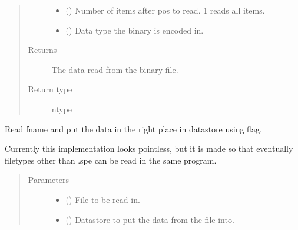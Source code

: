 \documentclass[a4paper,10pt,english]{sphinxmanual}
\begin{document}
\begin{fulllineitems}
\begin{fulllineitems}
\begin{quote}
\begin{description}
\begin{itemize}
\item {} 
\sphinxAtStartPar
{} () \textendash{} Number of items after pos to read. \sphinxhyphen{}1 reads all items.

\item {} 
\sphinxAtStartPar
{} () \textendash{} Data type the binary is encoded in.

\end{itemize}

\item[{Returns}] \leavevmode
\sphinxAtStartPar
{} \textendash{} The data read from the binary file.

\item[{Return type}] \leavevmode
\sphinxAtStartPar
ntype

\end{description}\end{quote}

\end{fulllineitems}


\begin{fulllineitems}
\label{\detokenize{sfgtools:sfgtools.SFGProcessTools.read_files}}
\sphinxAtStartPar
Read fname and put the data in the right place in datastore using flag.

\sphinxAtStartPar
Currently this implementation looks pointless, but it is made so that eventually filetypes other
than .spe can be read in the same program.
\begin{quote}\begin{description}
\item[{Parameters}] \leavevmode\begin{itemize}
\item {} 
\sphinxAtStartPar
{} () \textendash{} File to be read in.

\item {} 
\sphinxAtStartPar
{} () \textendash{} Datastore to put the data from the file into.


\end{itemize}
\end{description}
\end{quote}
\end{fulllineitems}
\end{fulllineitems}
\end{document}
